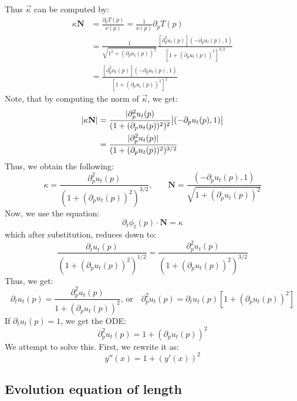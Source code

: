\documentclass{article}
\begin{document}
Thus $\vec{\kappa}$ can be computed by:
\begin{align*}
    \kappa\mathbf{N} &= \frac{\partial_p T(p)}{\nu(p)} = \frac{1}{\nu(p)}\partial_p T(p) \\
        &= \frac{1}{\sqrt{1^2 + (\partial_p u_t(p))^2}}\frac{[\partial_p^2 u_t(p)](-\partial_p u_t(p),1)}{[1+(\partial_p u_t(p))^2]^{3/2}} \\
        &= \frac{[\partial_p^2 u_t(p)](-\partial_p u_t(p),1)}{[1+(\partial_p u_t(p))^2]^2}
\end{align*}
Note, that by computing the norm of $\vec{\kappa}$, we get:
\begin{align*}
    |\kappa\mathbf{N}| &= \frac{|\partial_p^2 u_t(p)}{(1+(\partial_p u_t(p))^2)^2}\big{|}(-\partial_p u_t(p),1)\big{|} \\
    &= \frac{|\partial_p^2 u_t(p)|}{(1+(\partial_p u_t(p))^2)^{3/2}}
\end{align*}
Thus, we obtain the following:
\[ \kappa = \frac{\partial_p^2 u_t(p)}{(1+(\partial_p u_t(p))^2)^{3/2}}\text{,}\qquad \mathbf{N} = \frac{(-\partial_p u_t(p),1)}{\sqrt{1+(\partial_p u_t(p))^2}}\]
Now, we use the equation: 
\[ \partial_t \phi_t(p)\cdot \mathbf{N} = \kappa \]
which after substitution, reduces down to:
\[ \frac{\partial_t u_t(p)}{(1+(\partial_p u_t(p))^2)^{1/2}} = \frac{\partial_p^2 u_t(p)}{(1+(\partial_p u_t(p))^2)^{3/2}} \]
Thus, we get:
\[ \partial_t u_t(p) = \frac{\partial_p^2 u_t(p)}{1+(\partial_p u_t(p))^2}\text{, or}\quad \partial_p^2 u_t(p) = \partial_t u_t(p)[1+(\partial_p u_t(p))^2] \]
If $\partial_t u_t(p) = 1$, we get the ODE:
\[ \partial_p^2 u_t(p) = 1+(\partial_p u_t(p))^2 \]
We attempt to solve this. First, we rewrite it as:
\[ y''(x) = 1  + (y'(x))^2 \]

\subsection{Evolution equation of length}
\end{document}
